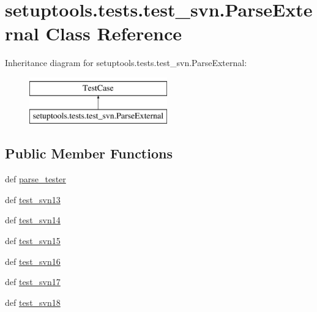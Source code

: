 \hypertarget{classsetuptools_1_1tests_1_1test__svn_1_1ParseExternal}{}\section{setuptools.\+tests.\+test\+\_\+svn.\+Parse\+External Class Reference}
\label{classsetuptools_1_1tests_1_1test__svn_1_1ParseExternal}
Inheritance diagram for setuptools.\+tests.\+test\+\_\+svn.\+Parse\+External\+:\begin{figure}[H]
\begin{center}
\leavevmode
\includegraphics[height=2.000000cm]{classsetuptools_1_1tests_1_1test__svn_1_1ParseExternal}
\end{center}
\end{figure}
\subsection*{Public Member Functions}
\begin{DoxyCompactItemize}
\item 
def \hyperlink{classsetuptools_1_1tests_1_1test__svn_1_1ParseExternal_ade393c4026fe7cda30196bc0469f6ded}{parse\+\_\+tester}
\item 
def \hyperlink{classsetuptools_1_1tests_1_1test__svn_1_1ParseExternal_a6971a935dd765ba48b7a3acd9785e623}{test\+\_\+svn13}
\item 
def \hyperlink{classsetuptools_1_1tests_1_1test__svn_1_1ParseExternal_a9170225531e36369443db2218d1a81e3}{test\+\_\+svn14}
\item 
def \hyperlink{classsetuptools_1_1tests_1_1test__svn_1_1ParseExternal_aabf6c608375985237464a3f4cce6a325}{test\+\_\+svn15}
\item 
def \hyperlink{classsetuptools_1_1tests_1_1test__svn_1_1ParseExternal_a2287554dbf6e153dd27ad8a155aa68f2}{test\+\_\+svn16}
\item 
def \hyperlink{classsetuptools_1_1tests_1_1test__svn_1_1ParseExternal_a675bd73c03737313766b5257f9d256f3}{test\+\_\+svn17}
\item 
def \hyperlink{classsetuptools_1_1tests_1_1test__svn_1_1ParseExternal_a083293102cf406c44a5422825302acff}{test\+\_\+svn18}
\end{DoxyCompactItemize}


